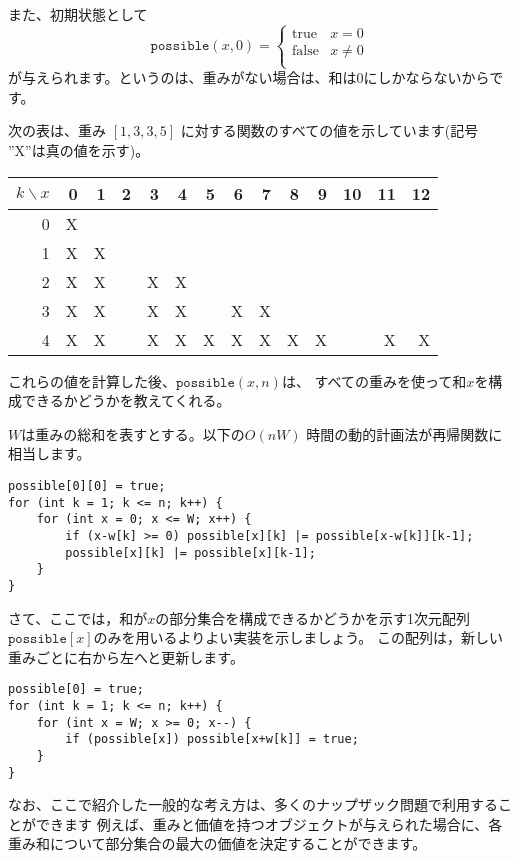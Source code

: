 また、初期状態として
\begin{equation*}
    \texttt{possible}(x,0) = \begin{cases}
               \textrm{true}    & x = 0\\
               \textrm{false}   & x \neq 0 \\
           \end{cases}
\end{equation*}
が与えられます。というのは、重みがない場合は、和は0にしかならないからです。

次の表は、重み $[1,3,3,5]$  に対する関数のすべての値を示しています(記号 ''X''は真の値を示す)。
\begin{center}
\begin{tabular}{r|rrrrrrrrrrrrr}
$k \backslash x$ & 0 & 1 & 2 & 3 & 4 & 5 & 6 & 7 & 8 & 9 & 10 & 11 & 12 \\
\hline
 0 & X & \\
 1 & X & X \\
 2 & X & X & & X & X \\
 3 & X & X & & X & X & & X & X \\
 4 & X & X & & X & X & X & X & X & X & X & & X & X \\
\end{tabular}
\end{center}

これらの値を計算した後、$\texttt{possible}(x,n)$は、
すべての重みを使って和$x$を構 成できるかどうかを教えてくれる。

$W$は重みの総和を表すとする。以下の$O(nW)$ 時間の動的計画法が再帰関数に相当します。
\begin{lstlisting}
possible[0][0] = true;
for (int k = 1; k <= n; k++) {
    for (int x = 0; x <= W; x++) {
        if (x-w[k] >= 0) possible[x][k] |= possible[x-w[k]][k-1];
        possible[x][k] |= possible[x][k-1];
    }
}
\end{lstlisting}

さて、ここでは，和が$x$の部分集合を構成できるかどうかを示す1次元配列
$\texttt{possible}[x]$のみを用いるよりよい実装を示しましょう。
この配列は，新しい重みごとに右から左へと更新します。

\begin{lstlisting}
possible[0] = true;
for (int k = 1; k <= n; k++) {
    for (int x = W; x >= 0; x--) {
        if (possible[x]) possible[x+w[k]] = true;
    }
}
\end{lstlisting}

なお、ここで紹介した一般的な考え方は、多くのナップザック問題で利用することができます
例えば、重みと価値を持つオブジェクトが与えられた場合に、各重み和について部分集合の最大の価値を決定することができます。

